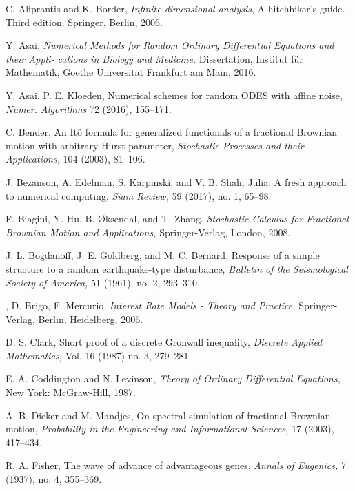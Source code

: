 \documentclass[reqno,12pt]{amsart}
\theoremstyle{plain} %
\theoremstyle{definition} %
\begin{document}
\begin{thebibliography}{25}

     C. Aliprantis and K. Border, \emph{Infinite dimensional analysis}, A hitchhiker's guide. Third edition. Springer, Berlin, 2006.

     Y. Asai, \emph{Numerical Methods for Random Ordinary Differential Equations and their Appli-
    cations in Biology and Medicine.} Dissertation, Institut f\"ur Mathematik, Goethe Universit\"at Frankfurt am Main, 2016.

     Y. Asai, P. E. Kloeden, Numerical schemes for random ODES with affine noise, \emph{Numer. Algorithms} 72 (2016), 155--171.

     C. Bender, An It\^o formula for generalized functionals of a fractional Brownian motion with arbitrary Hurst parameter, \emph{Stochastic Processes and their Applications,} 104 (2003), 81--106.

     J. Bezanson, A. Edelman, S. Karpinski, and V. B. Shah, Julia: A fresh approach to numerical computing, \emph{Siam Review,} 59 (2017), no. 1, 65--98.

     F. Biagini, Y. Hu, B. {\O}ksendal, and T. Zhang. \emph{Stochastic Calculus for Fractional Brownian Motion and Applications,} Springer-Verlag, London, 2008.

     J. L. Bogdanoff, J. E. Goldberg, and M. C. Bernard, Response of a simple structure to a random earthquake-type disturbance, \emph{Bulletin of the Seismological Society of America,} 51 (1961), no. 2, 293--310.

    , D. Brigo, F. Mercurio, \emph{Interest Rate Models - Theory and Practice,} Springer-Verlag, Berlin, Heidelberg, 2006.

     D. S. Clark, Short proof of a discrete Gronwall inequality, \emph{Discrete Applied Mathematics,} Vol. 16 (1987) no. 3, 279--281.

     E. A. Coddington and N. Levinson, \emph{Theory of Ordinary Differential Equations,} New York: McGraw-Hill, 1987.

     A. B. Dieker and M. Mandjes, On spectral simulation of fractional Brownian motion, \emph{Probability in the Engineering and Informational Sciences,} 17 (2003), 417--434.

     R. A. Fisher, The wave of advance of advantageous genes, \emph{Annals of Eugenics,} 7 (1937), no. 4, 355--369.


\end{thebibliography}
\end{document}
